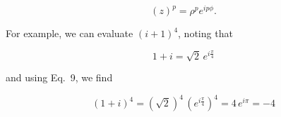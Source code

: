 \documentclass[12pt]{article}
\begin{document}
\begin{itemize}
  \begin{equation}
    \label{eq:zPow}
    (z)^p = \rho^p e^{i p \phi}.
  \end{equation}

  \noindent
  For example, we can evaluate $(i+1)^4$, noting that 

  \begin{equation}
    1+i = \sqrt{2} \, e^{i\frac{\pi}{4}}
  \end{equation}

  \noindent
  and using Eq.~9,%
  we find

  \begin{equation}
    (1+i)^4 = (\sqrt{2})^4 \, (e^{i\frac{\pi}{4}})^4 
    = 4 \, e^{i\pi} = -4
  \end{equation}

\end{itemize}
\end{document}
